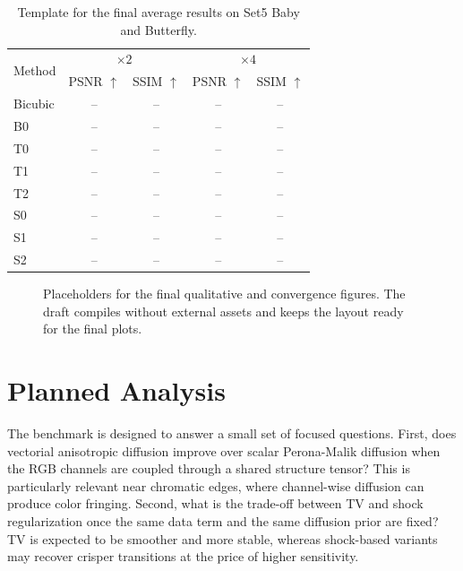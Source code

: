\documentclass[conference]{IEEEtran}
\begin{document}
\begin{table}[t]
\caption{Template for the final average results on Set5 Baby and Butterfly.}
\label{tab:main}
\begin{center}
\small
\begin{tabular}{lcc|cc}
\toprule
\multirow{2}{*}{Method} & \multicolumn{2}{c|}{$\times 2$} & \multicolumn{2}{c}{$\times 4$} \\
 & PSNR $\uparrow$ & SSIM $\uparrow$ & PSNR $\uparrow$ & SSIM $\uparrow$ \\
\midrule
Bicubic & -- & -- & -- & -- \\
B0 & -- & -- & -- & -- \\
T0 & -- & -- & -- & -- \\
T1 & -- & -- & -- & -- \\
T2 & -- & -- & -- & -- \\
S0 & -- & -- & -- & -- \\
S1 & -- & -- & -- & -- \\
S2 & -- & -- & -- & -- \\
\bottomrule
\end{tabular}
\end{center}
\end{table}

\begin{figure}[t]
\centering
{}
\hfill
{}
\caption{Placeholders for the final qualitative and convergence
figures. The draft compiles without external assets and keeps the
layout ready for the final plots.}
\label{fig:placeholders}
\end{figure}

\section{Planned Analysis}
The benchmark is designed to answer a small set of focused questions.
First, does vectorial anisotropic diffusion improve over scalar
Perona-Malik diffusion when the RGB channels are coupled through a
shared structure tensor? This is particularly relevant near chromatic
edges, where channel-wise diffusion can produce color fringing.
Second, what is the trade-off between TV and shock regularization once
the same data term and the same diffusion prior are fixed? TV is
expected to be smoother and more stable, whereas shock-based variants
may recover crisper transitions at the price of higher sensitivity.
\end{document}
